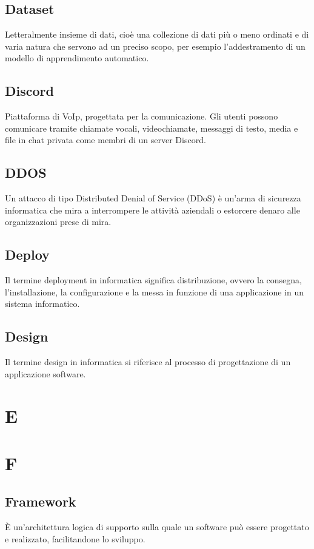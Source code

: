 \documentclass{classes/base}
\begin{document}
        \subsection*{Dataset}
        Letteralmente insieme di dati, cioè una collezione di dati più o meno ordinati e di varia natura che servono ad un preciso scopo, per esempio l'addestramento di un modello di apprendimento automatico.
       
        \subsection*{Discord}
        Piattaforma di VoIp, progettata per la comunicazione. Gli utenti possono comunicare tramite chiamate vocali, videochiamate, messaggi di testo, media e file in chat privata come membri di un server Discord.

        \subsection*{DDOS}
        Un attacco di tipo Distributed Denial of Service (DDoS) è un'arma di sicurezza informatica che mira a interrompere le attività aziendali o estorcere denaro alle organizzazioni prese di mira.

        \subsection*{Deploy}
        Il termine deployment in informatica significa distribuzione, ovvero la consegna, l'installazione, la configurazione e la messa in funzione di una applicazione in un sistema informatico.

        \subsection*{Design}
        Il termine design in informatica si riferisce al processo di progettazione di un applicazione software.

        \newpage  
    \section{E}
    
        \newpage  
    \section{F}
        \subsection*{Framework}
        È un'architettura logica di supporto sulla quale un software può essere progettato e realizzato, facilitandone lo sviluppo.
        
\end{document}

